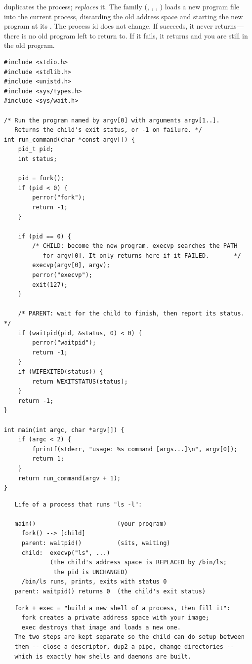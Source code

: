  duplicates the process;  \emph{replaces} it.
The  family (, , ,
) loads a new program file into the current process,
discarding the old address space and starting the new program at its
. The process id does not change. If  succeeds,
it never returns---there is no old program left to return to. If it
fails, it returns  and you are still in the old program.

\begin{lstlisting}[caption={Fork + exec: the standard recipe for "run this program".}]
#include <stdio.h>
#include <stdlib.h>
#include <unistd.h>
#include <sys/types.h>
#include <sys/wait.h>

/* Run the program named by argv[0] with arguments argv[1..].
   Returns the child's exit status, or -1 on failure. */
int run_command(char *const argv[]) {
    pid_t pid;
    int status;

    pid = fork();
    if (pid < 0) {
        perror("fork");
        return -1;
    }

    if (pid == 0) {
        /* CHILD: become the new program. execvp searches the PATH
           for argv[0]. It only returns here if it FAILED.       */
        execvp(argv[0], argv);
        perror("execvp");
        exit(127);
    }

    /* PARENT: wait for the child to finish, then report its status. */
    if (waitpid(pid, &status, 0) < 0) {
        perror("waitpid");
        return -1;
    }
    if (WIFEXITED(status)) {
        return WEXITSTATUS(status);
    }
    return -1;
}

int main(int argc, char *argv[]) {
    if (argc < 2) {
        fprintf(stderr, "usage: %s command [args...]\n", argv[0]);
        return 1;
    }
    return run_command(argv + 1);
}
\end{lstlisting}

\begin{verbatim}
   Life of a process that runs "ls -l":

   main()                       (your program)
     fork() --> [child]
     parent: waitpid()          (sits, waiting)
     child:  execvp("ls", ...)
             (the child's address space is REPLACED by /bin/ls;
              the pid is UNCHANGED)
     /bin/ls runs, prints, exits with status 0
   parent: waitpid() returns 0  (the child's exit status)
\end{verbatim}

\begin{verbatim}
   fork + exec = "build a new shell of a process, then fill it":
     fork creates a private address space with your image;
     exec destroys that image and loads a new one.
   The two steps are kept separate so the child can do setup between
   them -- close a descriptor, dup2 a pipe, change directories --
   which is exactly how shells and daemons are built.
\end{verbatim}

